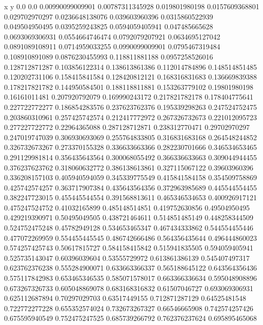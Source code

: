               x                y
            0.0              0.0
0.00990099009901  0.00787311345928
 0.019801980198  0.0157609368801
 0.029702970297  0.0236648138076
 0.039603960396  0.0315860522939
 0.049504950495  0.0395259243825
0.0594059405941   0.047485665628
0.0693069306931  0.0554664746474
0.0792079207921  0.0634695127042
0.0891089108911  0.0714959033255
0.0990099009901  0.0795467319484
 0.108910891089  0.0876230455993
 0.118811881188  0.0957258526016
 0.128712871287   0.103856122314
 0.138613861386   0.112014784896
 0.148514851485   0.120202731106
 0.158415841584   0.128420812121
 0.168316831683   0.136669839388
 0.178217821782   0.144950584501
 0.188118811881   0.153263779102
  0.19801980198    0.16161011481
 0.207920792079   0.169990243172
 0.217821782178   0.178404775641
 0.227722772277   0.186854283576
 0.237623762376   0.195339298263
 0.247524752475   0.203860310961
 0.257425742574   0.212417772972
 0.267326732673   0.221012095723
 0.277227722772    0.22964365088
 0.287128712871   0.238312770471
  0.29702970297   0.247019747039
 0.306930693069   0.255764833805
 0.316831683168   0.264548244852
 0.326732673267   0.273370155328
 0.336633663366   0.282230701666
 0.346534653465   0.291129981814
 0.356435643564   0.300068055492
 0.366336633663   0.309044944455
 0.376237623762   0.318060632772
 0.386138613861   0.327115067122
  0.39603960396   0.336208157103
 0.405940594059   0.345339775549
 0.415841584158   0.354509758869
 0.425742574257   0.363717907384
 0.435643564356   0.372963985689
 0.445544554455   0.382247723015
 0.455445544554   0.391568813611
 0.465346534653   0.400926917121
 0.475247524752    0.41032165899
 0.485148514851   0.419752630856
  0.49504950495   0.429219390971
  0.50495049505   0.438721464611
 0.514851485149   0.448258344509
 0.524752475248    0.45782949128
 0.534653465347   0.467434333862
 0.544554455446   0.477072269959
 0.554455445545   0.486742666486
 0.564356435644   0.496444860023
 0.574257425743    0.50617815727
 0.584158415842   0.515941835505
 0.594059405941   0.525735143047
  0.60396039604    0.53555729972
 0.613861386139   0.545407497317
 0.623762376238   0.555284900071
 0.633663366337   0.565188645122
 0.643564356436   0.575117842983
 0.653465346535   0.585071578017
 0.663366336634   0.595048908896
 0.673267326733   0.605048869078
 0.683168316832    0.61507046727
 0.693069306931   0.625112687894
  0.70297029703    0.63517449155
 0.712871287129    0.64525481548
 0.722772277228   0.655352574024
 0.732673267327    0.66546665908
 0.742574257426   0.675595940549
 0.752475247525   0.685739266792
 0.762376237624   0.695895465068
